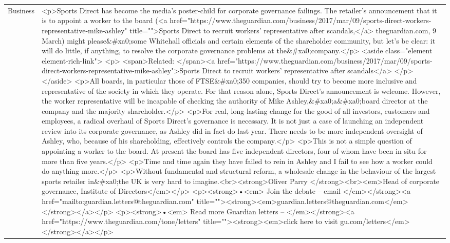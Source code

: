 \documentclass[]{article}
\begin{document}
\begin{table}[!h]
{\begin{tabular}[t]{ll}
Business & <p>Sports Direct has become the media’s poster-child for corporate governance failings. The retailer’s announcement that it is to appoint a worker to the board (<a href="https://www.theguardian.com/business/2017/mar/09/sports-direct-workers-representative-mike-ashley" title="">Sports Direct to recruit workers’ representative after scandals,</a> theguardian.com, 9 March) might please\&\#xa0;some Whitehall officials and certain elements of the shareholder community, but let’s be clear: it will do little, if anything, to resolve the corporate governance problems at the\&\#xa0;company.</p> <aside class="element element-rich-link"> <p> <span>Related: </span><a href="https://www.theguardian.com/business/2017/mar/09/sports-direct-workers-representative-mike-ashley">Sports Direct to recruit workers' representative after scandals</a> </p> </aside>  <p>All boards, in particular those of FTSE\&\#xa0;350 companies, should try to become more inclusive and representative of the society in which they operate. For that reason alone, Sports Direct’s announcement is welcome. However, the worker representative will be incapable of checking the authority of Mike Ashley,\&\#xa0;a\&\#xa0;board director at the company and the majority shareholder.</p> <p>For real, long-lasting change for the good of all investors, customers and employees, a radical overhaul of Sports Direct’s governance is necessary. It is not just a case of launching an independent review into its corporate governance, as Ashley did in fact do last year. There needs to be more independent oversight of Ashley, who, because of his shareholding, effectively controls the company.</p> <p>This is not a simple question of appointing a worker to the board. At present the board has five independent directors, four of whom have been in situ for more than five years.</p> <p>Time and time again they have failed to rein in Ashley and I fail to see how a worker could do anything more.</p> <p>Without fundamental and structural reform, a wholesale change in the behaviour of the largest sports retailer in\&\#xa0;the UK is very hard to imagine.<br><strong>Oliver Parry </strong><br><em>Head of corporate governance, Institute of Directors</em></p> <p><strong>•<em> Join the debate – email </em></strong><a href="mailto:guardian.letters@theguardian.com" title=""><strong><em>guardian.letters@theguardian.com</em></strong></a></p> <p><strong>•<em> Read more Guardian letters – </em></strong><a href="https://www.theguardian.com/tone/letters" title=""><strong><em>click here to visit gu.com/letters</em></strong></a></p>\\

\end{tabular}}
\end{table}
\end{document}
